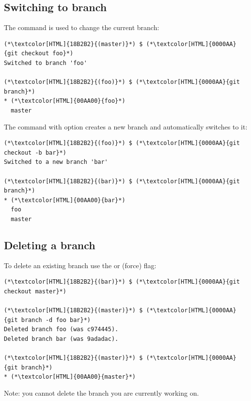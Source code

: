 \subsection{Switching to branch}
\begin{frame}[fragile]
  \subslidetitle
  The  command is used to change the current branch:
  \begin{lstlisting}
(*\textcolor[HTML]{18B2B2}{(master)}*) $ (*\textcolor[HTML]{0000AA}{git checkout foo}*)
Switched to branch 'foo'

(*\textcolor[HTML]{18B2B2}{(foo)}*) $ (*\textcolor[HTML]{0000AA}{git branch}*)
* (*\textcolor[HTML]{00AA00}{foo}*)
  master
\end{lstlisting}

  \vspace{1em}
  The  command with  option creates a new branch and automatically switches to it:
  \begin{lstlisting}
(*\textcolor[HTML]{18B2B2}{(foo)}*) $ (*\textcolor[HTML]{0000AA}{git checkout -b bar}*)
Switched to a new branch 'bar'

(*\textcolor[HTML]{18B2B2}{(bar)}*) $ (*\textcolor[HTML]{0000AA}{git branch}*)
* (*\textcolor[HTML]{00AA00}{bar}*)
  foo
  master
\end{lstlisting}
\end{frame}

\subsection{Deleting a branch}
\begin{frame}[fragile]
  \subslidetitle
  To delete an existing branch use the  or  (force) flag:
\begin{lstlisting}
(*\textcolor[HTML]{18B2B2}{(bar)}*) $ (*\textcolor[HTML]{0000AA}{git checkout master}*)

(*\textcolor[HTML]{18B2B2}{(master)}*) $ (*\textcolor[HTML]{0000AA}{git branch -d foo bar}*)
Deleted branch foo (was c974445).
Deleted branch bar (was 9adadac).

(*\textcolor[HTML]{18B2B2}{(master)}*) $ (*\textcolor[HTML]{0000AA}{git branch}*)
* (*\textcolor[HTML]{00AA00}{master}*)
\end{lstlisting}

  \vspace{1em}
  Note: you cannot delete the branch you are currently working on.
\end{frame}


